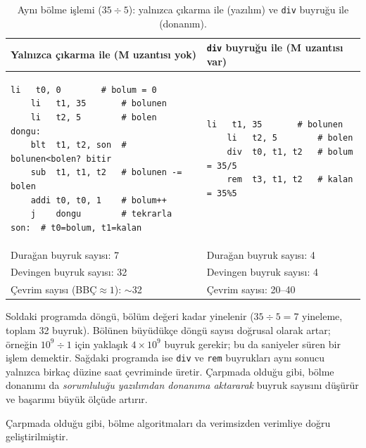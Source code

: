\begin{table}[htbp]
\centering
\caption[Yazılım ve donanım bölme karşılaştırması]{Aynı bölme işlemi ($35 \div 5$): yalnızca çıkarma ile (yazılım) ve \texttt{div} buyruğu ile (donanım).}
\label{tab:bolme-yazilim-donanim}
\small
\begin{tabular}{p{6.8cm}p{6.8cm}}
\toprule
\textbf{Yalnızca çıkarma ile (M uzantısı yok)} & \textbf{\texttt{div} buyruğu ile (M uzantısı var)} \\
\midrule
\begin{minipage}[t]{6.5cm}
\begin{lstlisting}[style=riscv, xleftmargin=0pt]
    li   t0, 0        # bolum = 0
    li   t1, 35       # bolunen
    li   t2, 5        # bolen
dongu:
    blt  t1, t2, son  # bolunen<bolen? bitir
    sub  t1, t1, t2   # bolunen -= bolen
    addi t0, t0, 1    # bolum++
    j    dongu        # tekrarla
son:  # t0=bolum, t1=kalan
\end{lstlisting}
\end{minipage}
&
\begin{minipage}[t]{6.5cm}
\begin{lstlisting}[style=riscv, xleftmargin=0pt]
    li   t1, 35       # bolunen
    li   t2, 5        # bolen
    div  t0, t1, t2   # bolum = 35/5
    rem  t3, t1, t2   # kalan = 35%5
\end{lstlisting}
\end{minipage}
\\
\midrule
Durağan buyruk sayısı: 7 & Durağan buyruk sayısı: 4 \\
Devingen buyruk sayısı: 32 & Devingen buyruk sayısı: 4 \\
Çevrim sayısı (BBÇ${}\approx 1$): $\sim$32 & Çevrim sayısı: 20--40 \\
\bottomrule
\end{tabular}
\end{table}

Soldaki programda döngü, bölüm değeri kadar yinelenir ($35 \div 5 = 7$ yineleme, toplam 32 buyruk). Bölünen büyüdükçe döngü sayısı doğrusal olarak artar; örneğin $10^9 \div 1$ için yaklaşık $4 \times 10^9$ buyruk gerekir; bu da saniyeler süren bir işlem demektir. Sağdaki programda ise \texttt{div} ve \texttt{rem} buyrukları aynı sonucu yalnızca birkaç düzine saat çevriminde üretir. Çarpmada olduğu gibi, bölme donanımı da \emph{sorumluluğu yazılımdan donanıma aktararak} buyruk sayısını düşürür ve başarımı büyük ölçüde artırır.

Çarpmada olduğu gibi, bölme algoritmaları da verimsizden verimliye doğru geliştirilmiştir.

